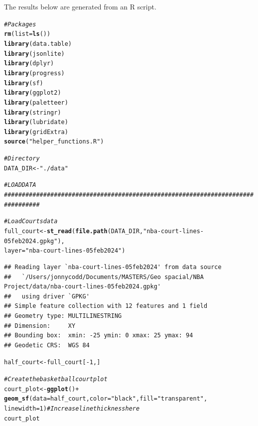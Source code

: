 \documentclass{article}\usepackage[]{graphicx}\usepackage[]{xcolor}
\makeatletter
\newcommand{\hlnum}[1]{\textcolor[rgb]{0.686,0.059,0.569}{#1}}%
\newcommand{\hlstr}[1]{\textcolor[rgb]{0.192,0.494,0.8}{#1}}%
\newcommand{\hlcom}[1]{\textcolor[rgb]{0.678,0.584,0.686}{\textit{#1}}}%
\newcommand{\hlopt}[1]{\textcolor[rgb]{0,0,0}{#1}}%
\newcommand{\hlstd}[1]{\textcolor[rgb]{0.345,0.345,0.345}{#1}}%
\newcommand{\hlkwb}[1]{\textcolor[rgb]{0.69,0.353,0.396}{#1}}%
\newcommand{\hlkwc}[1]{\textcolor[rgb]{0.333,0.667,0.333}{#1}}%
\newcommand{\hlkwd}[1]{\textcolor[rgb]{0.737,0.353,0.396}{\textbf{#1}}}%
\newenvironment{kframe}{%
 \def\at@end@of@kframe{}%
 \ifinner\ifhmode%
  \def\at@end@of@kframe{\end{minipage}}%
  \begin{minipage}{\columnwidth}%
 \fi\fi%
 \def\FrameCommand##1{\hskip\@totalleftmargin \hskip-\fboxsep
 \colorbox{shadecolor}{##1}\hskip-\fboxsep
     \hskip-\linewidth \hskip-\@totalleftmargin \hskip\columnwidth}%
 \MakeFramed {\advance\hsize-\width
   \@totalleftmargin\z@ \linewidth\hsize
   \@setminipage}}%
 {\par\unskip\endMakeFramed%
 \at@end@of@kframe}
\newenvironment{knitrout}{}{} %
\makeatother
\begin{document}
The results below are generated from an R script.

\begin{knitrout}
\color{fgcolor}\begin{kframe}
\begin{alltt}
\hlcom{# Packages}
\hlkwd{rm}\hlstd{(}\hlkwc{list}\hlstd{=}\hlkwd{ls}\hlstd{())}
\hlkwd{library}\hlstd{(data.table)}
\hlkwd{library}\hlstd{(jsonlite)}
\hlkwd{library}\hlstd{(dplyr)}
\hlkwd{library}\hlstd{(progress)}
\hlkwd{library}\hlstd{(sf)}
\hlkwd{library}\hlstd{(ggplot2)}
\hlkwd{library}\hlstd{(paletteer)}
\hlkwd{library}\hlstd{(stringr)}
\hlkwd{library}\hlstd{(lubridate)}
\hlkwd{library}\hlstd{(gridExtra)}
\hlkwd{source}\hlstd{(}\hlstr{"helper_functions.R"}\hlstd{)}

\hlcom{# Directory}
\hlstd{DATA_DIR} \hlkwb{<-} \hlstr{"./data"}

\hlcom{# LOAD DATA}
\hlcom{################################################################################}

\hlcom{# Load Courts data}
\hlstd{full_court} \hlkwb{<-} \hlkwd{st_read}\hlstd{(}\hlkwd{file.path}\hlstd{(DATA_DIR,} \hlstr{"nba-court-lines-05feb2024.gpkg"}\hlstd{),}
                      \hlkwc{layer} \hlstd{=} \hlstr{"nba-court-lines-05feb2024"}\hlstd{)}
\end{alltt}
\begin{verbatim}
## Reading layer `nba-court-lines-05feb2024' from data source 
##   `/Users/jonnycodd/Documents/MASTERS/Geo spacial/NBA Project/data/nba-court-lines-05feb2024.gpkg' 
##   using driver `GPKG'
## Simple feature collection with 12 features and 1 field
## Geometry type: MULTILINESTRING
## Dimension:     XY
## Bounding box:  xmin: -25 ymin: 0 xmax: 25 ymax: 94
## Geodetic CRS:  WGS 84
\end{verbatim}
\begin{alltt}
\hlstd{half_court} \hlkwb{<-} \hlstd{full_court[}\hlopt{-}\hlnum{1}\hlstd{, ]}

\hlcom{# Create the basketball court plot}
\hlstd{court_plot} \hlkwb{<-} \hlkwd{ggplot}\hlstd{()} \hlopt{+}
  \hlkwd{geom_sf}\hlstd{(}\hlkwc{data} \hlstd{= half_court,} \hlkwc{color} \hlstd{=} \hlstr{"black"}\hlstd{,} \hlkwc{fill} \hlstd{=} \hlstr{"transparent"}\hlstd{,}
          \hlkwc{linewidth}\hlstd{=} \hlnum{1}\hlstd{)}  \hlcom{# Increase line thickness here}
\hlstd{court_plot}
\end{alltt}
\end{kframe}


\end{knitrout}
\end{document}
